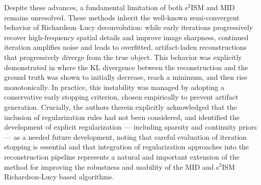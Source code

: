 \documentclass[letterpaper]{article}
\begin{document}
Despite these advances, a fundamental limitation of both s$^2$ISM and MID remains unresolved. These methods inherit the well-known semi-convergent behavior of Richardson–Lucy deconvolution: while early iterations progressively recover high-frequency spatial details and improve image sharpness, continued iteration amplifies noise and leads to overfitted, artifact-laden reconstructions that progressively diverge from the true object. This behavior was explicitly demonstrated in \cite{Zunino_2023} where the KL divergence between the reconstruction and the ground truth was shown to initially decrease, reach a minimum, and then rise monotonically. In practice, this instability was managed by adopting a conservative early stopping criterion, chosen empirically to prevent artifact generation. Crucially, the authors therein explicitly acknowledged that the inclusion of regularization rules had not been considered, and identified the development of explicit regularization — including sparsity and continuity priors — as a needed future development, noting that careful evaluation of iteration stopping is essential and that integration of regularization approaches into the reconstruction pipeline represents a natural and important extension of the method for improving the robustness and usability of the MID and s$^2$ISM Richardson-Lucy based algorithms.
\end{document}
